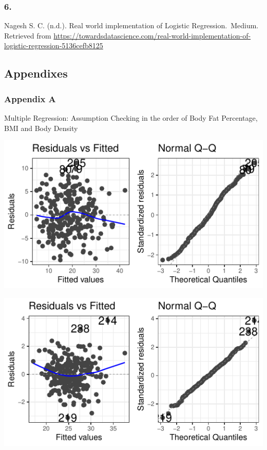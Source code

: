 \documentclass[a4paper,9pt,twocolumn,twoside,]{pinp}
\begin{document}
\hypertarget{section-5}{%
\subsubsection{6.}\label{section-5}}

Nagesh S. C. (n.d.). Real world implementation of Logistic
Regression.~Medium. Retrieved from
\url{https://towardsdatascience.com/real-world-implementation-of-logistic-regression-5136cefb8125}

\hypertarget{appendixes}{%
\subsection{Appendixes}\label{appendixes}}

\hypertarget{appendix-a}{%
\subsubsection{Appendix A}\label{appendix-a}}

Multiple Regression: Assumption Checking in the order of Body Fat
Percentage, BMI and Body Density

\begin{center}\includegraphics{Executive_Report_files/figure-latex/unnamed-chunk-5-1} \end{center}

\begin{center}\includegraphics{Executive_Report_files/figure-latex/unnamed-chunk-5-2} \end{center}
\end{document}
